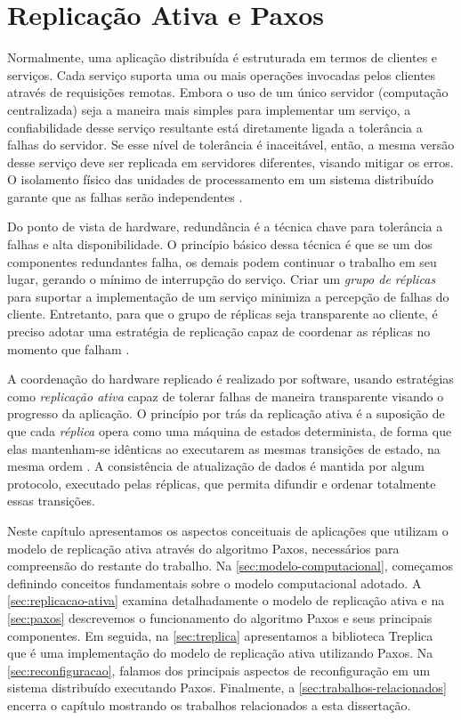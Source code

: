 \chapter{Replicação Ativa e Paxos}\label{cap1:replicacao_ativa_paxos}

Normalmente, uma aplicação distribuída é estruturada em termos de clientes e serviços.
Cada serviço suporta uma ou mais operações invocadas pelos clientes através de requisições
remotas. Embora o uso de um único servidor (computação centralizada) seja a maneira mais
simples para implementar um serviço, a confiabilidade desse serviço resultante está
diretamente ligada a tolerância a falhas do servidor. Se esse nível de tolerância é
inaceitável, então, a mesma versão desse serviço deve ser replicada em servidores
diferentes, visando mitigar os erros. O isolamento físico das unidades de processamento em
um sistema distribuído garante que as falhas serão independentes \cite{schneider90}.

Do ponto de vista de hardware, redundância é a técnica chave para tolerância a falhas e
alta disponibilidade. O princípio básico dessa técnica é que se um dos componentes
redundantes falha, os demais podem continuar o trabalho em seu lugar, gerando o mínimo de
interrupção do serviço. Criar um \emph{grupo de réplicas} para suportar a implementação de
um serviço minimiza a percepção de falhas do cliente. Entretanto, para que o grupo de
réplicas seja transparente ao cliente, é preciso adotar uma estratégia de replicação capaz
de coordenar as réplicas no momento que falham \cite{jalote94}.

A coordenação do hardware replicado é realizado por software, usando estratégias como
\emph{replicação ativa} capaz de tolerar falhas de maneira transparente visando o
progresso da aplicação. O princípio por trás da replicação ativa é a suposição de que cada
\emph{réplica} opera como uma máquina de estados determinista, de forma que elas
mantenham-se idênticas ao executarem as mesmas transições de estado, na mesma ordem
\cite{schneider90}. A consistência de atualização de dados é mantida por algum protocolo,
executado pelas réplicas, que permita difundir e ordenar totalmente essas transições.

Neste capítulo apresentamos os aspectos conceituais de aplicações que utilizam o modelo de
replicação ativa através do algoritmo Paxos, necessários para compreensão do restante do
trabalho. Na \autoref{sec:modelo-computacional}, começamos definindo conceitos
fundamentais sobre o modelo computacional adotado. A \autoref{sec:replicacao-ativa} examina
detalhadamente o modelo de replicação ativa e na \autoref{sec:paxos} descrevemos o
funcionamento do algoritmo Paxos e seus principais componentes. Em seguida, na
\autoref{sec:treplica} apresentamos a biblioteca Treplica que é uma implementação do
modelo de replicação ativa utilizando Paxos. Na \autoref{sec:reconfiguracao}, falamos dos
principais aspectos de reconfiguração em um sistema distribuído executando Paxos.
Finalmente, a \autoref{sec:trabalhos-relacionados} encerra o capítulo mostrando os
trabalhos relacionados a esta dissertação.


